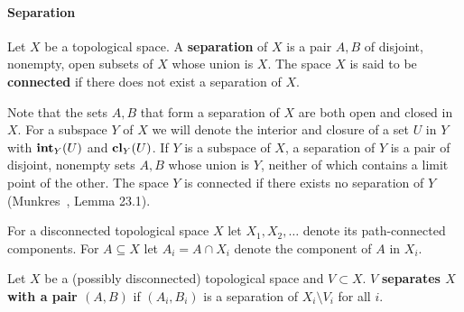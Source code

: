 

\paragraph{Separation}

Let $X$ be a topological space.
A \textbf{separation} of $X$ is a pair $A, B$ of disjoint, nonempty, open subsets of $X$ whose union is $X$.
The space $X$ is said to be \textbf{connected} if there does not exist a separation of $X$.

Note that the sets $A, B$ that form a separation of $X$ are both open and closed in $X$.
For a subspace $Y$ of $X$ we will denote the interior and closure of a set $U$ in $Y$ with $\mathbf{int}_Y(U)$ and $\mathbf{cl}_Y(U)$.
If $Y$ is a subspace of $X$, a separation of $Y$ is a pair of disjoint, nonempty sets $A, B$ whose union is $Y$, neither of which contains a limit point of the other.
The space $Y$ is connected if there exists no separation of $Y$ (Munkres~\cite{munkres00topology}, Lemma 23.1).



For a disconnected topological space $X$ let $X_1, X_2, \ldots$ denote its path-connected components.
For $A\subseteq X$ let $A_i = A\cap X_i$ denote the component of $A$ in $X_i$.

\begin{definition}
  Let $X$ be a (possibly disconnected) topological space and $V\subset X$.
  $V$ \textbf{separates $X$ with a pair $(A, B)$} if $(A_i, B_i)$ is a separation of $X_i\setminus V_i$ for all $i$.
\end{definition}

